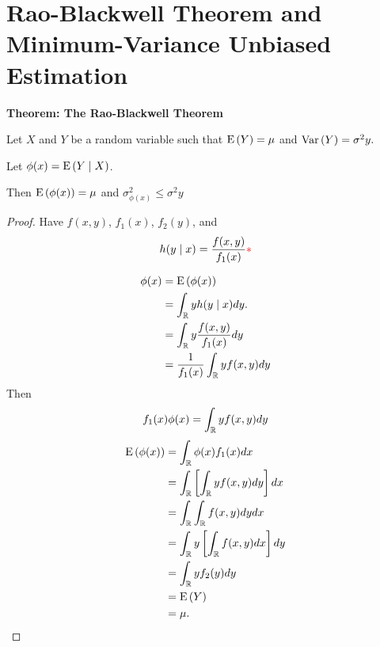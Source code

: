 \section{Rao-Blackwell Theorem and Minimum-Variance Unbiased Estimation}%
\textbf{Theorem: The Rao-Blackwell Theorem}

\nl Let $X$ and $Y$ be a random variable such that $\E{Y} = \mu$ and $\Var{Y} = \sigma^2 y.$

\nl Let $\phi(x) = \E{Y \mid X}$.

\nl Then $\E{\phi(x)} = \mu$ and $\sigma^2_{\phi(x)} \leq \sigma^2y$

\begin{proof}
    Have $f(x,y)$, $f_1(x)$, $f_2(y)$, and
    $$h(y\mid x) = \frac{f(x,y)}{f_1(x)} \color{red}{\ast}\color{black}$$
    
    \begin{align*}
        \phi(x) &= \E{\phi(x)} \\
        &= \int_{\R} yh(y \mid x)dy.\\
        &= \int_{\R} y\frac{f(x,y)}{f_1(x)}dy\\
        &= \over{f_1(x)}\int_{\R} yf(x,y) dy
    \end{align*}
    Then
    $$f_1(x) \phi(x) = \int_{\mathbb{R}} y f(x,y) dy$$
    \begin{align*}
        \E{\phi(x)} &= \int_{\R} \phi(x)f_1(x)dx\\
        &= \int_{\R} \brac{\int_{\R} y f(x,y) dy}dx\\
        &= \int_{\R}\int_{\R}f(x,y)dydx\\
        &= \int_{\R} y \brac{\int_{\R}f(x,y)dx}dy\\
        &= \int_{\R} y f_2(y)dy \\
        &= \E{Y} \\
        &= \mu.
    \end{align*}


\end{proof}
